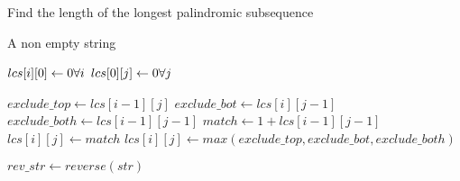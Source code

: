 \documentclass[12pt]{article}
\begin{document}
\begin{algorithm}

  \caption{Find the length of the longest palindromic subsequence}

  \begin{algorithmic}[1]
    \Require A non empty string
    \Statex

        
        \State $lcs[i][0] \gets 0 \hfill \forall i$ 
        \State $lcs[0][j] \gets 0 \hfill \forall j$ 

                \State $exclude\_top \gets lcs[i-1][j]$
                \State $exclude\_bot \gets lcs[i][j-1]$
                \State $exclude\_both \gets lcs[i-1][j-1]$
                \State $match \gets 1 + lcs[i-1][j-1] $
                    \State $lcs[i][j] \gets match$
                \Else 
                    \State $lcs[i][j] \gets max(exclude\_top, exclude\_bot, exclude\_both) $
                \EndIf
            \EndFor
        \EndFor
        
        \State {}
    \EndFunction
    \Statex
    
        \State $rev\_str \gets reverse(str)$
        \State {} 
    \EndFunction
  \end{algorithmic}

\end{algorithm}
\end{document}
